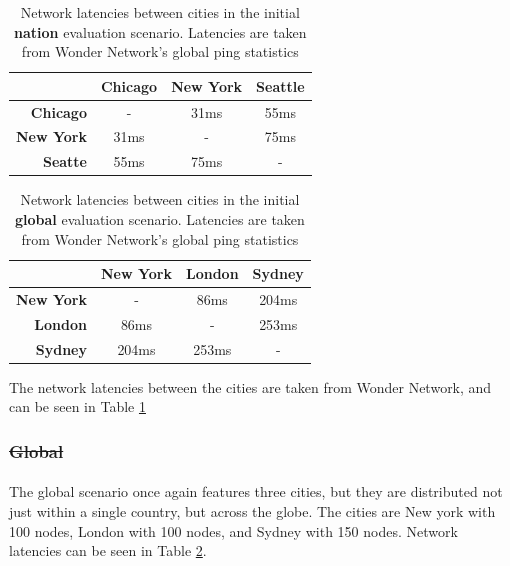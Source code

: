 \documentclass[draft,final]{vutinfth} %
\providecommand{\DIFaddtex}[1]{{\protect\color{blue}\uwave{#1}}} %
\providecommand{\DIFdeltex}[1]{{\protect\color{red}\sout{#1}}}                      %
\providecommand{\DIFaddbegin}{} %
\providecommand{\DIFaddend}{} %
\providecommand{\DIFdelbegin}{} %
\providecommand{\DIFdelend}{} %
\providecommand{\DIFadd}[1]{\texorpdfstring{\DIFaddtex{#1}}{#1}} %
\providecommand{\DIFdel}[1]{\texorpdfstring{\DIFdeltex{#1}}{}} %
\begin{document}
 \begin{table}[]
\centering
\begin{tabular}{r|ccc}
\multicolumn{1}{c|}{} & \textbf{Chicago} & \textbf{New York} & \textbf{Seattle} \\ \hline
\textbf{Chicago}      & -                & 31ms              & 55ms             \\
\textbf{New York}     & 31ms             & -                 & 75ms             \\
\textbf{Seatte}       & 55ms             & 75ms              & -                \\ \hline
\end{tabular}
\caption{Network latencies between cities in the initial \textbf{nation} evaluation scenario. Latencies are taken from Wonder Network's global ping statistics\cite{wondernetworkGlobalPingStatistics}}
\label{tab:initial_nation_pings}
\end{table}

\begin{table}[]
\centering
\begin{tabular}{r|ccc}
\multicolumn{1}{c|}{} & \textbf{New York} & \textbf{London} & \textbf{Sydney} \\ \hline
\textbf{New York}     & -                 & 86ms            & 204ms           \\
\textbf{London}       & 86ms              & -               & 253ms           \\
\textbf{Sydney}       & 204ms             & 253ms           & -               \\ \hline
\end{tabular}

\caption{Network latencies between cities in the initial \textbf{global} evaluation scenario. Latencies are taken from Wonder Network's global ping statistics\cite{wondernetworkGlobalPingStatistics}}
\label{tab:initial_global_pings}
\end{table}   

The network latencies between the cities are taken from Wonder Network\cite{wondernetworkGlobalPingStatistics}, and can be seen in Table \ref{tab:initial_nation_pings}

\DIFdelbegin \subsubsection{\DIFdel{Global}}
\addtocounter{subsubsection}{-1}%
\DIFdelend \DIFaddbegin \paragraph{\DIFadd{Global}}
\DIFaddend The global scenario once again features three cities, but they are distributed not just within a single country, but across the globe.
The cities are New york with 100 nodes, London with 100 nodes, and Sydney with 150 nodes.
Network latencies can be seen in Table \ref{tab:initial_global_pings}.
\end{document}
